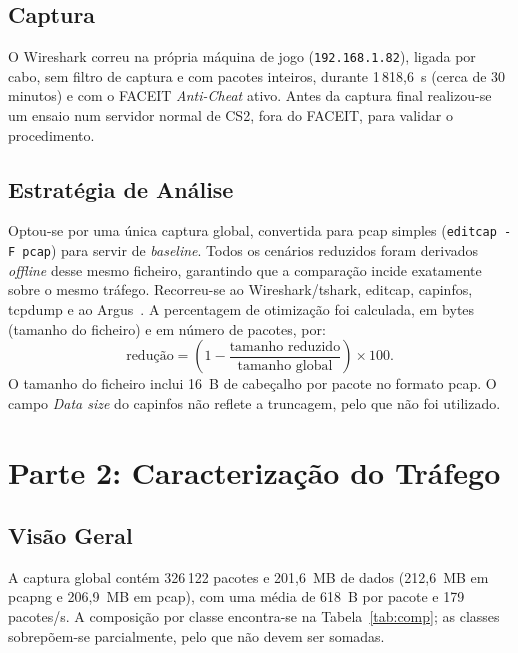 \documentclass[10.5pt,a4paper]{article}
\newcommand{\ip}[1]{\texttt{#1}}
\begin{document}
\subsection{Captura}
O Wireshark correu na própria máquina de jogo (\ip{192.168.1.82}), ligada por cabo, sem filtro
de captura e com pacotes inteiros, durante 1\,818,6~s (cerca de 30 minutos) e com o FACEIT
\emph{Anti-Cheat} ativo. Antes da captura final realizou-se um ensaio num servidor normal de
CS2, fora do FACEIT, para validar o procedimento.

\subsection{Estratégia de Análise}
Optou-se por uma única captura global, convertida para pcap simples (\texttt{editcap -F pcap})
para servir de \emph{baseline}. Todos os cenários reduzidos foram derivados \emph{offline}
desse mesmo ficheiro, garantindo que a comparação incide exatamente sobre o mesmo tráfego.
Recorreu-se ao Wireshark/tshark, editcap, capinfos, tcpdump e ao Argus~\cite{argus}. A
percentagem de otimização foi calculada, em bytes (tamanho do ficheiro) e em número de
pacotes, por:
\[
  \text{redução} = \left(1 - \frac{\text{tamanho reduzido}}{\text{tamanho global}}\right)\times 100.
\]
O tamanho do ficheiro inclui 16~B de cabeçalho por pacote no formato pcap. O campo
\emph{Data size} do capinfos não reflete a truncagem, pelo que não foi utilizado.

\section{Parte 2: Caracterização do Tráfego}

\subsection{Visão Geral}\label{sec:visao}
A captura global contém 326\,122 pacotes e 201,6~MB de dados (212,6~MB em pcapng e 206,9~MB em
pcap), com uma média de 618~B por pacote e 179 pacotes/s. A composição por classe encontra-se
na Tabela~\ref{tab:comp}; as classes sobrepõem-se parcialmente, pelo que não devem ser somadas.
\end{document}
